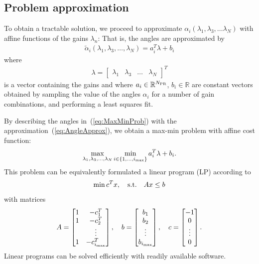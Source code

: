 \documentclass[conference,10pt]{IEEEtran}
\begin{document}
\subsection{Problem approximation}

To obtain a tractable solution, we proceed to approximate $\alpha_i(\lambda_1,\lambda_3,\dots\lambda_N)$ with affine functions of the gains $\lambda_n$: That is, the angles are approximated by
\begin{align}
\label{eq:AngleApprox}
\tilde{\alpha}_i(\lambda_1,\lambda_3,\dots, \lambda_N)
= a_i^T\lambda + b_i
\end{align}
where
\begin{align*}
\lambda =
\begin{bmatrix}
\lambda_1 & \lambda_3 & \dots & \lambda_N
\end{bmatrix}^T
\end{align*}
is a vector containing the gains and where $a_i\in\mathbb{R}^{N_{\rm PR}}$, $b_i\in\mathbb{R}$ are constant vectors obtained by sampling the value of the angles
$\alpha_i$ for a number of gain combinations, and performing a least squares fit.

By describing the angles in~(\ref{eq:MaxMinProb})
with the approximation~(\ref{eq:AngleApprox}), we obtain a max-min problem with affine cost function:
\begin{align}
\label{eq:MaxMinProbApprox}
\max_{\lambda_1,\lambda_3,\dots, \lambda_N}\min_{i\in \{1, \dots, i_{\rm max}\}} a_i^T\lambda + b_i.
\end{align}
 This problem can be equivalently formulated a linear program (LP) according to
\begin{align}
\label{eq:MaxMinProbLP}
\min c^Tx,\quad {\rm s.t.} \quad Ax\le b
\end{align}
with matrices
\begin{align*}
A =
\begin{bmatrix}
1 & -c^T_1\\
1 & -c^T_2\\
 & \vdots \\
1 & -c^T_{i_{\rm max}}
\end{bmatrix},\quad
b =
\begin{bmatrix}
b_1\\
b_2\\
\vdots \\
b_{i_{\rm max}}
\end{bmatrix},\quad
c =
\begin{bmatrix}
-1\\
0\\
\vdots \\
0
\end{bmatrix}.
\end{align*}
Linear programs can be solved efficiently with readily available software.
\end{document}
